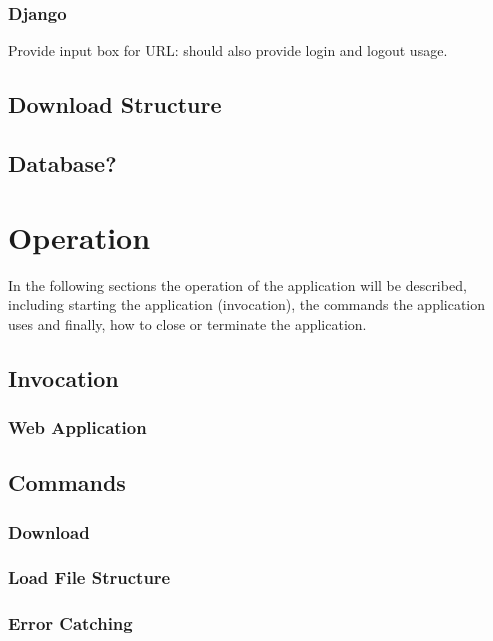 \documentclass{article}
\begin{document}
            \subsubsection{Django}
            Provide input box for URL: should also provide login and logout usage.

        \subsection{Download Structure}

        \subsection{Database?}


    \section{Operation}
    In the following sections the operation of the application will be described, including starting the application
    (invocation), the commands the application uses and finally, how to close or terminate the application.

        \subsection{Invocation}
            \subsubsection{Web Application}

        \subsection{Commands}
            \subsubsection{Download}
            
            \subsubsection{Load File Structure}

            \subsubsection{Error Catching}
\end{document}
